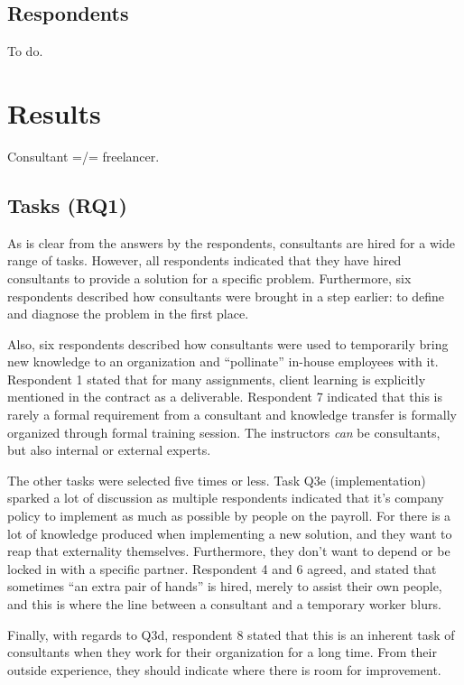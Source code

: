 \documentclass[12pt]{article}
\begin{document}
\subsection{Respondents}\label{respondents}

To do.

\section{Results}\label{results}

Consultant =/= freelancer.

\subsection{Tasks (RQ1)}\label{tasks-rq1}

As is clear from the answers by the respondents, consultants are hired
for a wide range of tasks. However, all respondents indicated that they
have hired consultants to provide a solution for a specific problem.
Furthermore, six respondents described how consultants were brought in a
step earlier: to define and diagnose the problem in the first place.

Also, six respondents described how consultants were used to temporarily
bring new knowledge to an organization and ``pollinate'' in-house
employees with it. Respondent 1 stated that for many assignments, client
learning is explicitly mentioned in the contract as a deliverable.
Respondent 7 indicated that this is rarely a formal requirement from a
consultant and knowledge transfer is formally organized through formal
training session. The instructors \emph{can} be consultants, but also
internal or external experts.

The other tasks were selected five times or less. Task Q3e
(implementation) sparked a lot of discussion as multiple respondents
indicated that it's company policy to implement as much as possible by
people on the payroll. For there is a lot of knowledge produced when
implementing a new solution, and they want to reap that externality
themselves. Furthermore, they don't want to depend or be locked in with
a specific partner. Respondent 4 and 6 agreed, and stated that sometimes
``an extra pair of hands'' is hired, merely to assist their own people,
and this is where the line between a consultant and a temporary worker
blurs.

Finally, with regards to Q3d, respondent 8 stated that this is an
inherent task of consultants when they work for their organization for a
long time. From their outside experience, they should indicate where
there is room for improvement.
\end{document}
